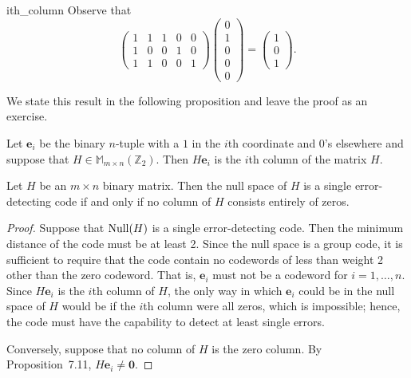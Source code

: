  
\begin{example}{ith_column}
Observe that
\[
\begin{pmatrix}
1 & 1 & 1 & 0 & 0 \\
1 & 0 & 0 & 1 & 0 \\
1 & 1 & 0 & 0 & 1
\end{pmatrix}
\begin{pmatrix}
 0 \\ 1 \\ 0 \\ 0 \\ 0
\end{pmatrix}
=
\begin{pmatrix}
1 \\ 0 \\ 1
\end{pmatrix}.
\]
\end{example}
 
 
We state this result in the following proposition and leave the proof
as an exercise. 
 
\begin{proposition}
Let ${\mathbf e}_i$ be the binary $n$-tuple with a $1$ in the $i$th
coordinate and $0$'s elsewhere and suppose that $H \in {\mathbb M}_{m
\times n}({\mathbb Z}_2)$. Then $H{\mathbf e}_i$ is the $i$th column of
the matrix $H$.  
\end{proposition}
 
 
\begin{theorem}
Let $H$ be an $m \times n$ binary matrix. Then the null space of $H$
is a single error-detecting code if and only if no column of $H$
consists entirely of zeros. 
\end{theorem}
 
 
\begin{proof}
Suppose that ${\rm Null}(H)$ is a single error-detecting code. Then the minimum
distance of the code must be at least 2. Since the null space is a
group code, it is sufficient to require that the code contain no
codewords of less than weight 2 other than the zero codeword. That
is, ${\mathbf e}_i$ must not be a codeword for $i = 1, \ldots, n$. Since
$H{\mathbf e}_i$ is the $i$th column of $H$, the only way in which
${\mathbf e}_i$ could be in the null space of $H$ would be if the $i$th
column were all zeros, which is impossible; hence, the code must have
the capability to detect at least single errors.
 
 
Conversely, suppose that no column of $H$ is the zero column. By 
Proposition~7.11, $H{\mathbf e}_i \neq {\mathbf 0}$.
\end{proof}
 
